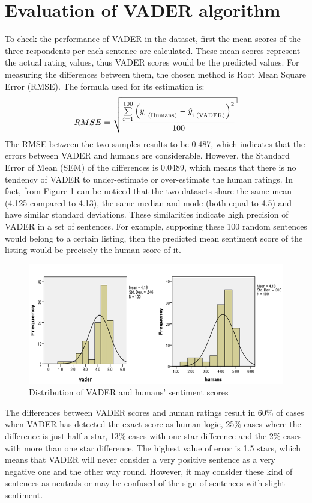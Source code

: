 \section{Evaluation of VADER algorithm}
To check the performance of VADER in the dataset, first the mean scores of the three respondents per each sentence are calculated. These mean scores represent the actual rating values, thus VADER scores would  be the predicted values.  For measuring the differences between them, the chosen method is Root Mean Square Error (RMSE). The formula used for its estimation is:
\begin{equation}
 RMSE = \sqrt {{\frac{{\sum\limits_{{i = 1}}^{100} {{{\left( {{y_\textsubscript{i (Humans)}} - {{\hat{y}}_\textsubscript{i (VADER)}}} \right)}^2}} }}{{100}}}}
 \label{RMSE}
\end{equation}
The RMSE between the two samples results to be 0.487, which indicates that the errors between VADER and humans are considerable. However, the Standard Error of Mean (SEM) of the differences is 0.0489, which means that there is no tendency of VADER to under-estimate or over-estimate the human ratings. In fact, from Figure \ref{fig:distribution} can be noticed that the two datasets share the same mean (4.125 compared to 4.13), the same median and mode (both equal to 4.5) and have similar standard deviations. These similarities indicate high precision of VADER in a set of sentences. For example, supposing these 100 random sentences would belong to a certain listing, then the predicted mean sentiment score of the listing would be precisely the human score of it. 
\begin{figure}[h!]
	\centering
	\includegraphics[height=0.33\textheight]{graphs_vader_humans}
	\caption{Distribution of VADER and humans' sentiment scores}
	\label{fig:distribution}
\end{figure}

The differences between VADER scores and human ratings result in 60\% of cases when VADER has detected the exact score as human logic, 25\% cases where the difference is just half a star, 13\% cases with one star difference and the 2\% cases with more than one star difference. The highest value of error is 1.5 stars, which means that VADER will never consider a very positive sentence as a very negative one and the other way round. However, it may consider these kind of sentences as neutrals or may be confused of the sign of sentences with slight sentiment.

